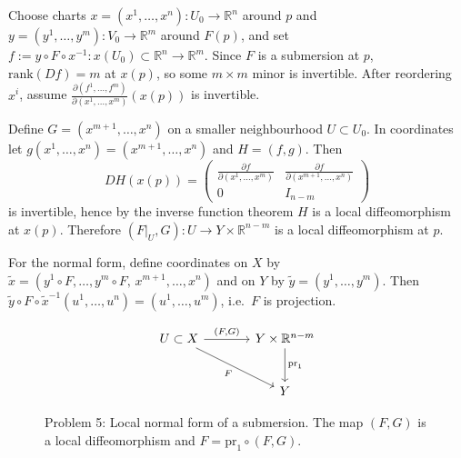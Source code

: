\begin{solution}
Choose charts $x=(x^1,\dots,x^n):U_0\to \mathbb{R}^n$ around $p$ and
$y=(y^1,\dots,y^m):V_0\to \mathbb{R}^m$ around $F(p)$, and set
$f:= y\circ F\circ x^{-1}:x(U_0)\subset\mathbb{R}^n\to \mathbb{R}^m$.
Since $F$ is a submersion at $p$, $\mathrm{rank}(Df)=m$ at $x(p)$, so some $m\times m$ minor is invertible.
After reordering $x^i$, assume
$\frac{\partial(f^1,\dots,f^m)}{\partial(x^1,\dots,x^m)}(x(p))$ is invertible.

Define $G=(x^{m+1},\dots,x^n)$ on a smaller neighbourhood $U\subset U_0$.
In coordinates let $g(x^1,\dots,x^n)=(x^{m+1},\dots,x^n)$ and $H=(f,g)$.
Then
\[
DH(x(p))=
\begin{pmatrix}
	\frac{\partial f}{\partial (x^1,\dots,x^m)} & \frac{\partial f}{\partial (x^{m+1},\dots,x^n)}\\
	0 & I_{n-m}
\end{pmatrix}
\]
is invertible, hence by the inverse function theorem $H$ is a local diffeomorphism at $x(p)$.
Therefore $(F|_U,G):U\to Y\times\mathbb{R}^{n-m}$ is a local diffeomorphism at $p$.

For the normal form, define coordinates on $X$ by
$\tilde x=(y^1\circ F,\dots,y^m\circ F,\,x^{m+1},\dots,x^n)$
and on $Y$ by $\tilde y=(y^1,\dots,y^m)$.
Then $\tilde y\circ F\circ \tilde x^{-1}(u^1,\dots,u^n)=(u^1,\dots,u^m)$, i.e.\ $F$ is projection.


\begin{figure}[htbp]
	\centering
	\[
	\begin{tikzcd}[row sep=large, column sep=large]
		U \subset X \arrow[r, "{(F,G)}"] \arrow[dr, "F"'] & Y \times \mathbb{R}^{n-m} \arrow[d, "\mathrm{pr}_1"] \\
		& Y
	\end{tikzcd}
	\]
	\caption{Problem 5: Local normal form of a submersion. The map $(F,G)$ is a local diffeomorphism and $F=\mathrm{pr}_1\circ (F,G)$.}
\end{figure}


\end{solution}

